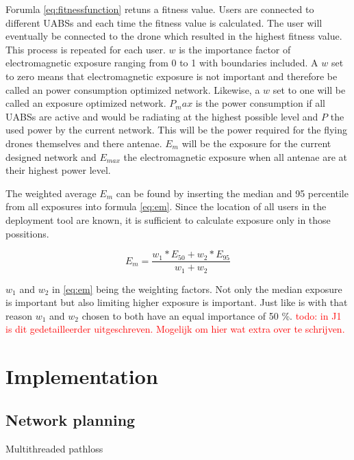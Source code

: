 Forumla \ref{eq:fitnessfunction} retuns a fitness value. Users are connected to different \gls{UABS}s and each time the fitness value is 
calculated. The user will eventually be connected to the drone which resulted in the highest fitness value. This process is repeated for each user.
$w$ is the importance factor of electromagnetic exposure ranging from 0 to 1 with boundaries included. A $w$ set to zero means that electromagnetic 
exposure is not important and therefore be called an power consumption optimized network. Likewise, a $w$ set to one will be called an exposure optimized 
network. $P_max$ is the power consumption if all \gls{UABS}s are active and would be radiating at the highest possible level and $P$ the used power by the current network. 
This will be the power required for the flying drones themselves and there antenae.
$E_m$ will be the exposure for the current designed network and $E_{max}$ the electromagnetic exposure when all antenae are at their highest power level.

The weighted average $E_m$ can be found by inserting the median and 95 percentile from all exposures into formula \ref{eq:em}. Since the location of all users in 
the deployment tool are known, it is sufficient to calculate exposure only in those possitions. 

\begin{equation} 
E_m = \frac{w_1 * E_{50} + w_2 * E_{95}}{w_1 + w_2}
\label{eq:em}
\end{equation}

$w_1$ and $w_2$ in \ref{eq:em} being the weighting factors. Not only the median exposure is important but also limiting higher exposure is important. 
Just like \cite{J1} is with that reason $w_1$ and $w_2$ chosen to both have an equal importance of 50 \%.
\textcolor{red}{todo: in J1 is dit gedetailleerder uitgeschreven. Mogelijk om hier wat extra over te schrijven.}


\section{Implementation}

\subsection{Network planning}

Multithreaded pathloss

